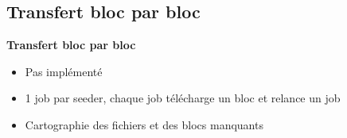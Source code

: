 \documentclass{beamer}
\begin{document}
\begin{frame}
    \section{Transfert bloc par bloc}
	
    \textbf{Transfert bloc par bloc}
	\begin{itemize}
    \item Pas implémenté

    \item 1 job par seeder, chaque job télécharge un bloc et relance un job

    \item Cartographie des fichiers et des blocs manquants
	\end{itemize}
\end{frame}
\end{document}
